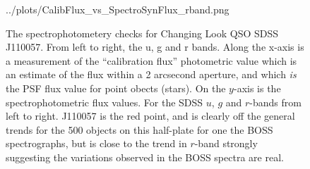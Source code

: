 \documentclass{emulateapj}
\begin{document}
\begin{figure}
  {../plots/CalibFlux_vs_SpectroSynFlux_rband.png}
  \centering
  \caption[]{The spectrophotometery checks for Changing Look QSO SDSS J110057. 
    From left to right, the u, g and r bands. 
    Along the x-axis is a measurement of the ``calibration flux'' photometric value 
    which is an estimate of the flux within a 2 arcsecond aperture, and which {\it is} 
    the PSF flux value for point obects (stars). On the $y$-axis is the spectrophotometric
    flux values. For the SDSS $u$, $g$ and $r$-bands from left to right. 
J110057 is the red point, and is clearly off the general trends for the 500 objects 
on this half-plate for one the BOSS spectrographs, but is close to the trend in 
$r$-band strongly suggesting the variations observed in the BOSS spectra are real.} 
 \label{fig:w1100m0052_halpha}
\end{figure}



 

\end{document}
